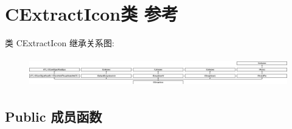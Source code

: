 \hypertarget{class_c_extract_icon}{}\section{C\+Extract\+Icon类 参考}
\label{class_c_extract_icon}
类 C\+Extract\+Icon 继承关系图\+:\begin{figure}[H]
\begin{center}
\leavevmode
\includegraphics[height=1.272727cm]{class_c_extract_icon}
\end{center}
\end{figure}
\subsection*{Public 成员函数}
